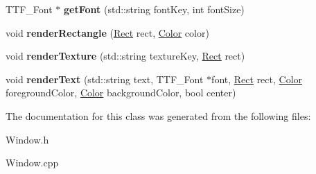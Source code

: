 \begin{DoxyCompactItemize}
\mbox{\label{class_window_a13b85acfb08ad3ab526bbe71158c7dcc}} 
T\+T\+F\+\_\+\+Font $\ast$ {\bfseries get\+Font} (std\+::string font\+Key, int font\+Size)
\item 
\mbox{\label{class_window_a94011a77192e38baa21bb3e86ffabf8c}} 
void {\bfseries render\+Rectangle} (\mbox{\hyperlink{struct_rect}{Rect}} rect, \mbox{\hyperlink{struct_color}{Color}} color)
\item 
\mbox{\label{class_window_ac523b07058eac58d3c4dd27d52aba51d}} 
void {\bfseries render\+Texture} (std\+::string texture\+Key, \mbox{\hyperlink{struct_rect}{Rect}} rect)
\item 
\mbox{\label{class_window_ae9a460a8d85af7da21fabb4ee2d24169}} 
void {\bfseries render\+Text} (std\+::string text, T\+T\+F\+\_\+\+Font $\ast$font, \mbox{\hyperlink{struct_rect}{Rect}} rect, \mbox{\hyperlink{struct_color}{Color}} foreground\+Color, \mbox{\hyperlink{struct_color}{Color}} background\+Color, bool center)
\end{DoxyCompactItemize}


The documentation for this class was generated from the following files\+:\begin{DoxyCompactItemize}
\item 
Window.\+h\item 
Window.\+cpp\end{DoxyCompactItemize}
